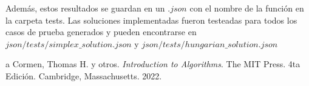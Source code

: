 \documentclass[10pt]{article} %
\begin{document}
 	 Adem\'as, estos resultados se guardan en un $ .json $ con el nombre de la funci\'on en la carpeta tests. Las soluciones implementadas fueron testeadas para todos los casos de prueba generados y pueden encontrarse en $ json/tests/simplex\_solution.json $ y $ json/tests/hungarian\_solution.json $
	
	
	\begin{thebibliography}
		a
		 Cormen, Thomas H. y otros. \emph{Introduction to Algorithms}. 
		The MIT Press.
		4ta Edici\'on.		
		Cambridge, Massachusetts.
		2022.
	\end{thebibliography}
\end{document}

